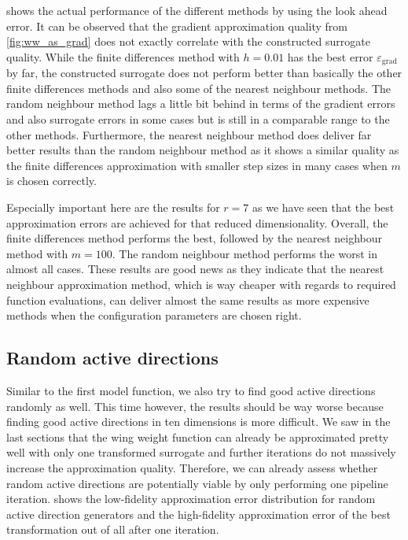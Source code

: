 \documentclass[
  a4paper,  %
  twoside,  %
  bibliography=totoc,
  headsepline,
  cleardoublepage=empty,
  parskip=half,
  draft=false
]{scrbook}
\begin{document}
%
 shows the actual performance of the different methods by using the look ahead error.
It can be observed that the gradient approximation quality from \cref{fig:ww_as_grad} does not exactly correlate with the constructed surrogate quality.
While the finite differences method with $h=0.01$ has the best error $\varepsilon_{\mathrm{grad}}$ by far, the constructed surrogate does not perform better than basically the other finite differences methods and also some of the nearest neighbour methods.
The random neighbour method lags a little bit behind in terms of the gradient errors and also surrogate errors in some cases but is still in a comparable range to the other methods.
Furthermore, the nearest neighbour method does deliver far better results than the random neighbour method as it shows a similar quality as the finite differences approximation with smaller step sizes in many cases when $m$ is chosen correctly.

Especially important here are the results for $r=7$ as we have seen that the best approximation errors are achieved for that reduced dimensionality.
Overall, the finite differences method performs the best, followed by the nearest neighbour method with $m=100$.
The random neighbour method performs the worst in almost all cases.
These results are good news as they indicate that the nearest neighbour approximation method, which is way cheaper with regards to required function evaluations, can deliver almost the same results as more expensive methods when the configuration parameters are chosen right.


\subsection{Random active directions}

Similar to the first model function, we also try to find good active directions randomly as well.
This time however, the results should be way worse because finding good active directions in ten dimensions is more difficult.
We saw in the last sections that the wing weight function can already be approximated pretty well with only one transformed surrogate and further iterations do not massively increase the approximation quality.
Therefore, we can already assess whether random active directions are potentially viable by only performing one pipeline iteration.
 shows the low-fidelity approximation error distribution for random active direction generators and the high-fidelity approximation error of the best transformation out of all after one iteration.
\end{document}

